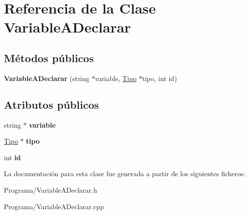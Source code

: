 \hypertarget{class_variable_a_declarar}{\section{Referencia de la Clase Variable\-A\-Declarar}
\label{class_variable_a_declarar}
}
\subsection*{Métodos públicos}
\begin{DoxyCompactItemize}
\item 
\hypertarget{class_variable_a_declarar_a93c37d6e9894a4534c8e811f0b3eea54}{{\bfseries Variable\-A\-Declarar} (string $\ast$variable, \hyperlink{class_tipo}{Tipo} $\ast$tipo, int id)}\label{class_variable_a_declarar_a93c37d6e9894a4534c8e811f0b3eea54}

\end{DoxyCompactItemize}
\subsection*{Atributos públicos}
\begin{DoxyCompactItemize}
\item 
\hypertarget{class_variable_a_declarar_afeaaa282a453f10534a9b93cdbc3c2db}{string $\ast$ {\bfseries variable}}\label{class_variable_a_declarar_afeaaa282a453f10534a9b93cdbc3c2db}

\item 
\hypertarget{class_variable_a_declarar_a639a3360dca5ef22d00b24c290edf254}{\hyperlink{class_tipo}{Tipo} $\ast$ {\bfseries tipo}}\label{class_variable_a_declarar_a639a3360dca5ef22d00b24c290edf254}

\item 
\hypertarget{class_variable_a_declarar_accf6a3ae83a56cbe37bde9ab7bd4f140}{int {\bfseries id}}\label{class_variable_a_declarar_accf6a3ae83a56cbe37bde9ab7bd4f140}

\end{DoxyCompactItemize}


La documentación para esta clase fue generada a partir de los siguientes ficheros\-:\begin{DoxyCompactItemize}
\item 
Programa/Variable\-A\-Declarar.\-h\item 
Programa/Variable\-A\-Declarar.\-cpp\end{DoxyCompactItemize}
